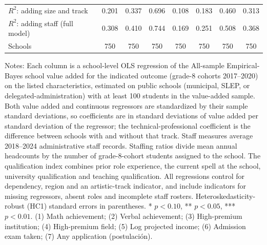 \begin{table}[!htbp]
{\begin{tabular}{lccccccc}
$R^2$: adding size and track & 0.201 & 0.337 & 0.696 & 0.108 & 0.183 & 0.460 & 0.313 \\
$R^2$: adding staff (full model) & 0.308 & 0.410 & 0.744 & 0.169 & 0.251 & 0.508 & 0.368 \\
Schools & 750 & 750 & 750 & 750 & 750 & 750 & 750 \\
\bottomrule
\end{tabular}}
\par\medskip
\footnotesize
\begin{minipage}{\textwidth}
Notes: Each column is a school-level OLS regression of the All-sample Empirical-Bayes school value added for the indicated outcome (grade-8 cohorts 2017--2020) on the listed characteristics, estimated on public schools (municipal, SLEP, or delegated-administration) with at least 100 students in the value-added sample. Both value added and continuous regressors are standardized by their sample standard deviations, so coefficients are in standard deviations of value added per standard deviation of the regressor; the technical-professional coefficient is the difference between schools with and without that track. Staff measures average 2018--2024 administrative staff records. Staffing ratios divide mean annual headcounts by the number of grade-8-cohort students assigned to the school. The qualification index combines prior role experience, the current spell at the school, university qualification and teaching qualification. All regressions control for dependency, region and an artistic-track indicator, and include indicators for missing regressors, absent roles and incomplete staff rosters. Heteroskedasticity-robust (HC1) standard errors in parentheses. * $p<0.10$, ** $p<0.05$, *** $p<0.01$. (1) Math achievement; (2) Verbal achievement; (3) High-premium institution; (4) High-premium field; (5) Log projected income; (6) Admission exam taken; (7) Any application (postulaci\'on).
\end{minipage}
\end{table}
